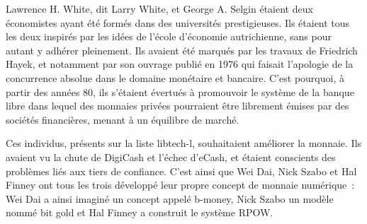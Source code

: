 Lawrence H. White, dit Larry White, et George A. Selgin étaient deux économistes ayant été formés dans des universités prestigieuses. Ils étaient tous les deux inspirés par les idées de l'école d'économie autrichienne, sans pour autant y adhérer pleinement. Ils avaient été marqués par les travaux de Friedrich Hayek, et notamment par son ouvrage  publié en 1976 qui faisait l'apologie de la concurrence absolue dans le domaine monétaire et bancaire. C'est pourquoi, à partir des années 80, ils s'étaient évertués à promouvoir le système de la banque libre dans lequel des monnaies privées pourraient être librement émises par des sociétés financières, menant à un équilibre de marché.

Ces individus, présents sur la liste libtech-l, souhaitaient améliorer la monnaie. Ils avaient vu la chute de DigiCash et l'échec d'eCash, et étaient conscients des problèmes liés aux tiers de confiance. C'est ainsi que Wei Dai, Nick Szabo et Hal Finney ont tous les trois développé leur propre concept de monnaie numérique~: Wei Dai a ainsi imaginé un concept appelé b-money, Nick Szabo un modèle nommé bit gold et Hal Finney a construit le système RPOW.

